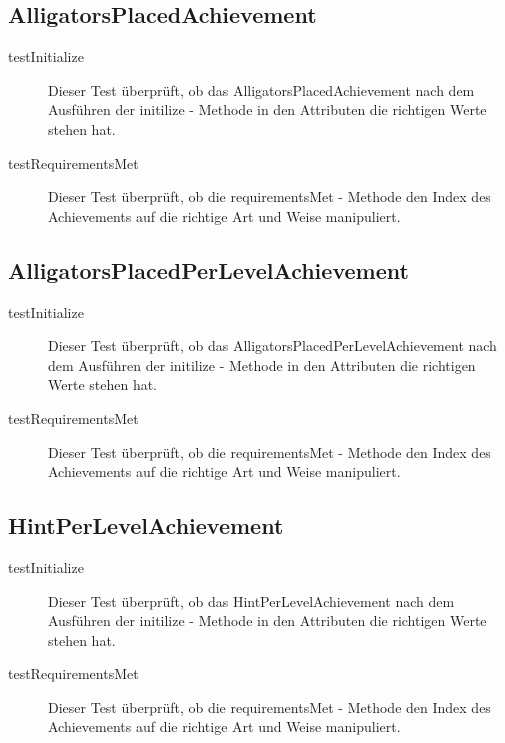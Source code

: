 \subsection{AlligatorsPlacedAchievement}

\begin{description}
\item[testInitialize]
Dieser Test überprüft, ob das AlligatorsPlacedAchievement nach dem Ausführen der initilize - Methode in den Attributen die richtigen Werte stehen hat.

\item[testRequirementsMet]
Dieser Test überprüft, ob die requirementsMet - Methode den Index des Achievements auf die richtige Art und Weise manipuliert.

\end{description}

\subsection{AlligatorsPlacedPerLevelAchievement}

\begin{description}
\item[testInitialize]
Dieser Test überprüft, ob das AlligatorsPlacedPerLevelAchievement nach dem Ausführen der initilize - Methode in den Attributen die richtigen Werte stehen hat.

\item[testRequirementsMet]
Dieser Test überprüft, ob die requirementsMet - Methode den Index des Achievements auf die richtige Art und Weise manipuliert.

\end{description}

\subsection{HintPerLevelAchievement}

\begin{description}
\item[testInitialize]
Dieser Test überprüft, ob das HintPerLevelAchievement nach dem Ausführen der initilize - Methode in den Attributen die richtigen Werte stehen hat.

\item[testRequirementsMet]
Dieser Test überprüft, ob die requirementsMet - Methode den Index des Achievements auf die richtige Art und Weise manipuliert.

\end{description}

